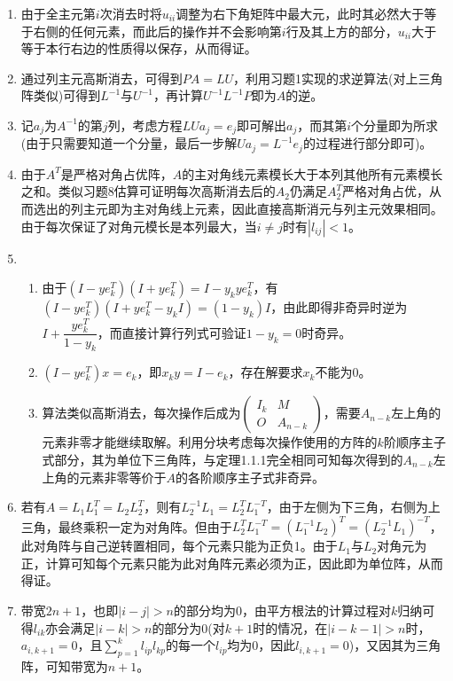 \documentclass[a4paper,UTF8,fontset=windows]{ctexart}
\begin{document}
\begin{enumerate}
\item
由于全主元第$i$次消去时将$u_{ii}$调整为右下角矩阵中最大元，此时其必然大于等于右侧的任何元素，而此后的操作并不会影响第$i$行及其上方的部分，$u_{ii}$大于等于本行右边的性质得以保存，从而得证。

\item
通过列主元高斯消去，可得到$PA=LU$，利用习题1实现的求逆算法(对上三角阵类似)可得到$L^{-1}$与$U^{-1}$，再计算$U^{-1}L^{-1}P$即为$A$的逆。

\item
记$a_j$为$A^{-1}$的第$j$列，考虑方程$LUa_j=e_j$即可解出$a_j$，而其第$i$个分量即为所求(由于只需要知道一个分量，最后一步解$Ua_j=L^{-1}e_j$的过程进行部分即可)。

\item
由于$A^T$是严格对角占优阵，$A$的主对角线元素模长大于本列其他所有元素模长之和。类似习题8估算可证明每次高斯消去后的$A_2$仍满足$A_2^T$严格对角占优，从而选出的列主元即为主对角线上元素，因此直接高斯消元与列主元效果相同。由于每次保证了对角元模长是本列最大，当$i\ne j$时有$|l_{ij}|<1$。

\item
\begin{enumerate}[(1)]
\item
由于$(I-ye_k^T)(I+ye_k^T)=I-y_kye_k^T$，有$(I-ye_k^T)(I+ye_k^T-y_kI)=(1-y_k)I$，由此即得非奇异时逆为$I+\dfrac{ye_k^T}{1-y_k}$，而直接计算行列式可验证$1-y_k=0$时奇异。

\item
$(I-ye_k^T)x=e_k$，即$x_ky=I-e_k$，存在解要求$x_k$不能为0。

\item
算法类似高斯消去，每次操作后成为$\begin{pmatrix}I_k&M\\O&A_{n-k}\end{pmatrix}$，需要$A_{n-k}$左上角的元素非零才能继续取解。利用分块考虑每次操作使用的方阵的$k$阶顺序主子式部分，其为单位下三角阵，与定理1.1.1完全相同可知每次得到的$A_{n-k}$左上角的元素非零等价于$A$的各阶顺序主子式非奇异。
\end{enumerate}

\item
若有$A=L_1L_1^T=L_2L_2^T$，则有$L_2^{-1}L_1=L_2^TL_1^{-T}$，由于左侧为下三角，右侧为上三角，最终乘积一定为对角阵。但由于$L_2^TL_1^{-T}=(L_1^{-1}L_2)^T=(L_2^{-1}L_1)^{-T}$，此对角阵与自己逆转置相同，每个元素只能为正负1。由于$L_1$与$L_2$对角元为正，计算可知每个元素只能为此对角阵元素必须为正，因此即为单位阵，从而得证。

\item
带宽$2n+1$，也即$|i-j|>n$的部分均为0，由平方根法的计算过程对$k$归纳可得$l_{ik}$亦会满足$|i-k|>n$的部分为0(对$k+1$时的情况，在$|i-k-1|>n$时，$a_{i,k+1}=0$，且$\sum_{p=1}^{k}l_{ip}l_{kp}$的每一个$l_{ip}$均为0，因此$l_{i,k+1}=0$)，又因其为三角阵，可知带宽为$n+1$。


\end{enumerate}
\end{document}
